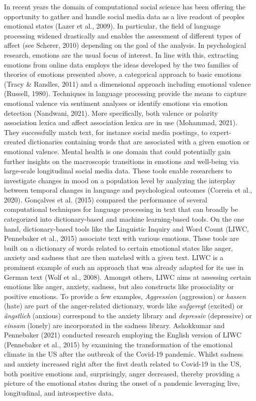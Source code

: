 \documentclass[
  english,
  jou,floatsintext]{apa7}
\begin{document}
In recent years the domain of computational social science has been offering the opportunity to gather and handle social media data as a live readout of peoples emotional states (Lazer et al., 2009). In particular, the field of language processing widened drastically and enables the assessment of different types of affect (see Scherer, 2010) depending on the goal of the analysis. In psychological research, emotions are the usual focus of interest. In line with this, extracting emotions from online data employs the ideas developed by the two families of theories of emotions presented above, a categorical approach to basic emotions (Tracy \& Randles, 2011) and a dimensional approach including emotional valence (Russell, 1980).
Techniques in language processing provide the means to capture emotional valence via sentiment analyses or identify emotions via emotion detection (Nandwani, 2021). More specifically, both valence or polarity association lexica and affect association lexica are in use (Mohammad, 2021). They successfully match text, for instance social media postings, to expert-created dictionaries containing words that are associated with a given emotion or emotional valence. Mental health is one domain that could potentially gain further insights on the macroscopic transitions in emotions and well-being via large-scale longitudinal social media data.
These tools enable researchers to investigate changes in mood on a population level by analyzing the interplay between temporal changes in language and psychological outcomes (Correia et al., 2020). Gonçalves et al. (2015) compared the performance of several computational techniques for language processing in text that can broadly be categorized into dictionary-based and machine learning-based tools.
On the one hand, dictionary-based tools like the Linguistic Inquiry and Word Count (LIWC, Pennebaker et al., 2015) associate text with various emotions. These tools are built on a dictionary of words related to certain emotional states like anger, anxiety and sadness that are then matched with a given text.
LIWC is a prominent example of such an approach that was already adapted for its use in German text (Wolf et al., 2008). Amongst others, LIWC aims at assessing certain emotions like anger, anxiety, sadness, but also constructs like prosociality or positive emotions. To provide a few examples, \emph{Aggression} (aggression) or \emph{hassen} (hate) are part of the anger-related dictionary, words like \emph{aufgeregt} (excited) or \emph{ängstlich} (anxious) correspond to the anxiety library and \emph{depressiv} (depressive) or \emph{einsam} (lonely) are incorporated in the sadness library. Ashokkumar and Pennebaker (2021) conducted research employing the English version of LIWC (Pennebaker et al., 2015) by examining the transformation of the emotional climate in the US after the outbreak of the Covid-19 pandemic. Whilst sadness and anxiety increased right after the first death related to Covid-19 in the US, both positive emotions and, surprisingly, anger decreased, thereby providing a picture of the emotional states during the onset of a pandemic leveraging live, longitudinal, and introspective data.
\end{document}
